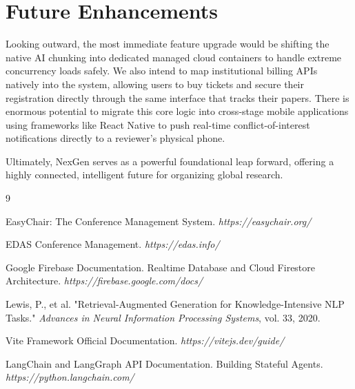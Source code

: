 \documentclass[12pt,a4paper]{report}
\begin{document}
\section{Future Enhancements}
Looking outward, the most immediate feature upgrade would be shifting the native AI chunking into dedicated managed cloud containers to handle extreme concurrency loads safely. We also intend to map institutional billing APIs natively into the system, allowing users to buy tickets and secure their registration directly through the same interface that tracks their papers. There is enormous potential to migrate this core logic into cross-stage mobile applications using frameworks like React Native to push real-time conflict-of-interest notifications directly to a reviewer's physical phone. 

Ultimately, NexGen serves as a powerful foundational leap forward, offering a highly connected, intelligent future for organizing global research.

\newpage

\begin{thebibliography}{9}

EasyChair: The Conference Management System.
\textit{https://easychair.org/}

EDAS Conference Management.
\textit{https://edas.info/}

Google Firebase Documentation. Realtime Database and Cloud Firestore Architecture.
\textit{https://firebase.google.com/docs/}

Lewis, P., et al. "Retrieval-Augmented Generation for Knowledge-Intensive NLP Tasks." 
\textit{Advances in Neural Information Processing Systems}, vol. 33, 2020. 

Vite Framework Official Documentation.
\textit{https://vitejs.dev/guide/}

LangChain and LangGraph API Documentation. Building Stateful Agents.
\textit{https://python.langchain.com/}

\end{thebibliography}
\end{document}

